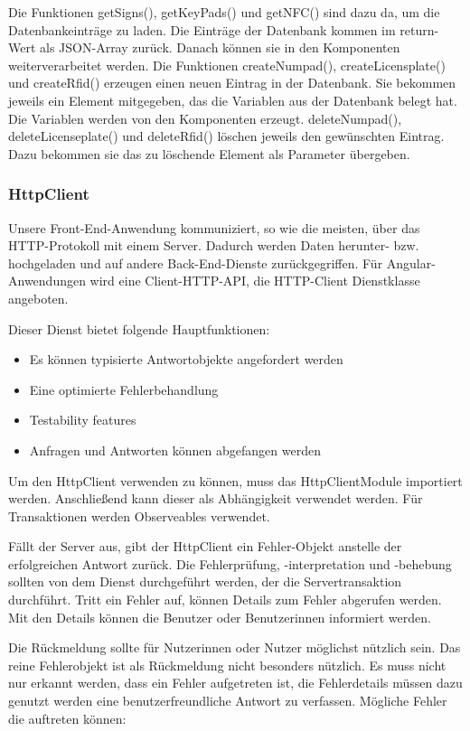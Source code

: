 Die Funktionen getSigns(), getKeyPads() und getNFC() sind dazu da, um die Datenbankeinträge zu laden. Die Einträge der Datenbank kommen im return-Wert als JSON-Array zurück. Danach können sie in den Komponenten weiterverarbeitet werden.
Die Funktionen createNumpad(), createLicensplate() und createRfid() erzeugen einen neuen Eintrag in der Datenbank. Sie bekommen jeweils ein Element mitgegeben, das die Variablen aus der Datenbank belegt hat. Die Variablen werden von den Komponenten erzeugt.
deleteNumpad(), deleteLicenseplate() und deleteRfid() löschen jeweils den gewünschten Eintrag. Dazu bekommen sie das zu löschende Element als Parameter übergeben.


\subsubsection{HttpClient}
Unsere Front-End-Anwendung kommuniziert, so wie die meisten, über das HTTP-Protokoll mit einem Server. Dadurch werden Daten herunter- bzw. hochgeladen und auf andere Back-End-Dienste zurückgegriffen. Für Angular-Anwendungen wird eine Client-HTTP-API, die HTTP-Client Dienstklasse angeboten.

Dieser Dienst bietet folgende Hauptfunktionen:
\begin{itemize}
    \item Es können typisierte Antwortobjekte angefordert werden
    \item Eine optimierte Fehlerbehandlung
    \item Testability features
    \item Anfragen und Antworten können abgefangen werden    
\end{itemize}

Um den HttpClient verwenden zu können, muss das HttpClientModule importiert werden. Anschließend kann dieser als Abhängigkeit verwendet werden. Für Transaktionen werden Observeables verwendet.

Fällt der Server aus, gibt der HttpClient ein Fehler-Objekt anstelle der erfolgreichen Antwort zurück. Die Fehlerprüfung, -interpretation und -behebung sollten von dem Dienst durchgeführt werden, der die Servertransaktion durchführt. Tritt ein Fehler auf, können Details zum Fehler abgerufen werden. Mit den Details können die Benutzer oder Benutzerinnen informiert werden. 

Die Rückmeldung sollte für Nutzerinnen oder Nutzer möglichst nützlich sein. Das reine Fehlerobjekt ist als Rückmeldung nicht besonders nützlich. Es muss nicht nur erkannt werden, dass ein Fehler aufgetreten ist, die Fehlerdetails müssen dazu genutzt werden eine benutzerfreundliche Antwort zu verfassen. Mögliche Fehler die auftreten können:

